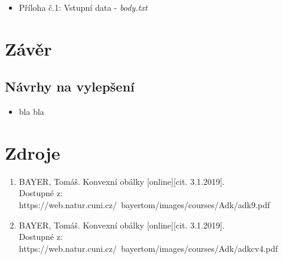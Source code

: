 \documentclass[a4paper, 12pt]{article}
\begin{document}
\begin{itemize}
	\item Příloha č.1: Vstupní data - \textit{body.txt}
\end{itemize}

\section{Závěr}

\subsection{Návrhy na vylepšení}

\begin{itemize}
\item bla bla
\end{itemize}

\clearpage
\section{Zdroje}

\begin{enumerate}
\item  BAYER, Tomáš. Konvexní obálky [online][cit. 3.1.2019]. \\
Dostupné z: https://web.natur.cuni.cz/~bayertom/images/courses/Adk/adk9.pdf  \\

\item  BAYER, Tomáš. Konvexní obálky [online][cit. 3.1.2019]. \\
Dostupné z: https://web.natur.cuni.cz/~bayertom/images/courses/Adk/adkcv4.pdf\\
\end{enumerate}
\end{document}
